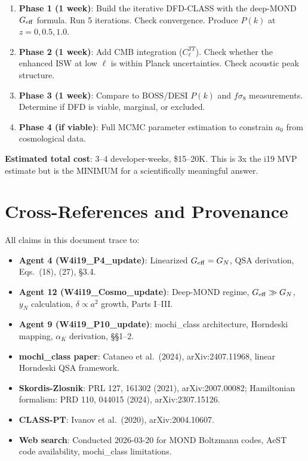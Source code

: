 \documentclass[11pt]{article}
\theoremstyle{definition}
\theoremstyle{remark}
\newcommand{\Geff}{G_{\rm eff}}
\begin{document}
\begin{enumerate}
\item \textbf{Phase 1 (1 week)}: Build the iterative DFD-CLASS with
  the deep-MOND $\Geff$ formula. Run 5 iterations. Check convergence.
  Produce $P(k)$ at $z = 0, 0.5, 1.0$.

\item \textbf{Phase 2 (1 week)}: Add CMB integration ($C_\ell^{TT}$).
  Check whether the enhanced ISW at low $\ell$ is within Planck
  uncertainties. Check acoustic peak structure.

\item \textbf{Phase 3 (1 week)}: Compare to BOSS/DESI $P(k)$ and
  $f\sigma_8$ measurements. Determine if DFD is viable, marginal,
  or excluded.

\item \textbf{Phase 4 (if viable)}: Full MCMC parameter estimation
  to constrain $a_0$ from cosmological data.
\end{enumerate}

\textbf{Estimated total cost}: 3--4 developer-weeks, \$15--20K.
This is 3x the i19 MVP estimate but is the MINIMUM for a
scientifically meaningful answer.


\section*{Cross-References and Provenance}

All claims in this document trace to:
\begin{itemize}
\item \textbf{Agent 4 (W4i19\_P4\_update)}: Linearized $\Geff = G_N$,
  QSA derivation, Eqs.~(18), (27), \S3.4.
\item \textbf{Agent 12 (W4i19\_Cosmo\_update)}: Deep-MOND regime,
  $\Geff \gg G_N$, $y_N$ calculation, $\delta \propto a^2$ growth,
  Parts I--III.
\item \textbf{Agent 9 (W4i19\_P10\_update)}: mochi\_class architecture,
  Horndeski mapping, $\alpha_K$ derivation, \S\S1--2.
\item \textbf{mochi\_class paper}: Cataneo et al.\ (2024),
  arXiv:2407.11968, linear Horndeski QSA framework.
\item \textbf{Skordis-Zlosnik}: PRL 127, 161302 (2021),
  arXiv:2007.00082; Hamiltonian formalism: PRD 110, 044015 (2024),
  arXiv:2307.15126.
\item \textbf{CLASS-PT}: Ivanov et al.\ (2020), arXiv:2004.10607.
\item \textbf{Web search}: Conducted 2026-03-20 for MOND Boltzmann
  codes, AeST code availability, mochi\_class limitations.
\end{itemize}
\end{document}
